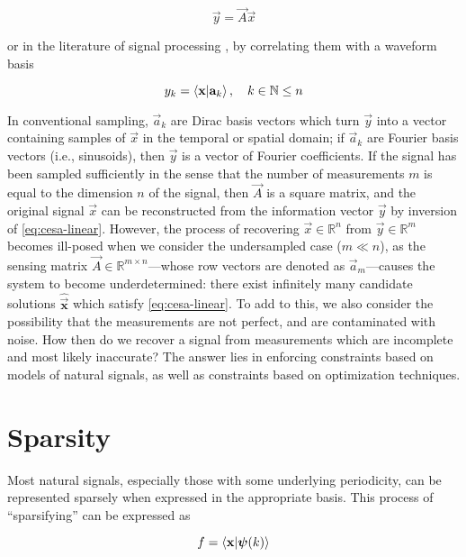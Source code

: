 \begin{equation}\label{eq:cesa-linear}
	\vec{y} = \vec{A} \vec{x}
\end{equation}

\noindent or in the literature of signal processing \cite{Candes2008b}, by correlating them with a waveform basis

\begin{equation}\label{eq:cesa-correlation}
	y_k = \innerproduct{\vec{x}}{\vec{a}_k} , \quad k \in \mathbb{N} \leq n
\end{equation}

In conventional sampling, $\vec{a}_k$ are Dirac basis vectors which turn $\vec{y}$ into a vector containing samples of $\vec{x}$ in the temporal or spatial domain; if $\vec{a}_k$ are Fourier basis vectors (i.e., sinusoids), then $\vec{y}$ is a vector of Fourier coefficients. If the signal has been sampled sufficiently in the sense that the number of measurements $m$ is equal to the dimension $n$ of the signal, then $\vec{A}$ is a square matrix, and the original signal $\vec{x}$ can be reconstructed from the information vector $\vec{y}$ by inversion of \eqref{eq:cesa-linear}. However, the process of recovering $\vec{x} \in \mathbb{R}^n$ from $\vec{y} \in \mathbb{R}^m$ becomes ill-posed when we consider the undersampled case ($m \ll n$), as the sensing matrix $\vec{A} \in \mathbb{R}^{m \times n}$---whose row vectors are denoted as $\vec{a}_m$---causes the system to become underdetermined: there exist infinitely many candidate solutions $\bm\hat{\vec{x}}$ which satisfy \eqref{eq:cesa-linear}. To add to this, we also consider the possibility that the measurements are not perfect, and are contaminated with noise. How then do we recover a signal from measurements which are incomplete and most likely inaccurate? The answer lies in enforcing constraints based on models of natural signals, as well as constraints based on optimization techniques.

\section{Sparsity}
\label{sec:sparsity}

Most natural signals, especially those with some underlying periodicity, can be represented sparsely when expressed in the appropriate basis. This process of ``sparsifying'' can be expressed as

\begin{equation}\label{eq:sparsify}
	f = \innerproduct{\vec{x}}{\bm\psi(k)}
\end{equation}


